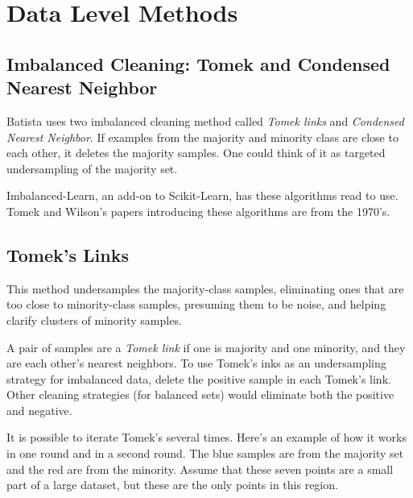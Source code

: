 \section{Data Level Methods}

\subsection{Imbalanced Cleaning:  Tomek and Condensed Nearest Neighbor}

Batista
\cite{BATISTA_2004}
uses two imbalanced cleaning method called {\it Tomek links} and {\it Condensed Nearest Neighbor}.  If examples from the majority and minority class are close to each other, it deletes the majority samples.   One could think of it as targeted undersampling of the majority set.  

Imbalanced-Learn, an add-on to Scikit-Learn, has these algorithms read to use.  Tomek and Wilson's papers introducing these algorithms are from the 1970's.  


\subsection{Tomek's Links}

This method undersamples the majority-class samples, eliminating ones that are too close to minority-class samples, presuming them to be noise, and helping clarify clusters of minority samples.  

A pair of samples are a {\it Tomek link} if one is majority and one minority, and they are each other's nearest neighbors. To use Tomek's inks as an undersampling strategy for imbalanced data, delete the positive sample in each Tomek's link.  Other cleaning strategies (for balanced sets) would eliminate both the positive and negative.  

It is possible to iterate Tomek's several times.  Here's an example of how it works in one round and in a second round.  The blue samples are from the majority set and the red are from the minority.  Assume that these seven points are a small part of a large dataset, but these are the only points in this region.

\

\noindent\hfil{}

